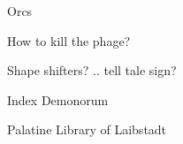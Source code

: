

Orcs 



How to kill the phage?

Shape shifters?
.. tell tale sign?






Index Demonorum

Palatine Library of Laibstadt






